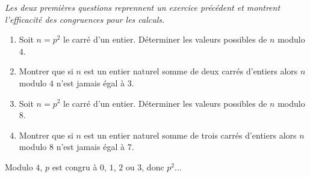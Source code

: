 \documentclass[11pt,class=report,crop=false]{standalone}
\begin{document}
\exercice{}

\enonce
\emph{Les deux premières questions reprennent un exercice précédent et montrent l'efficacité des congruences pour les calculs.}
\begin{enumerate}
    \item Soit $n=p^2$ le carré d'un entier. Déterminer les valeurs possibles de $n$ modulo $4$.
    
    \item Montrer que si $n$ est un entier naturel somme de deux carrés d'entiers 
    alors $n$ modulo $4$ n'est jamais égal à $3$.
    
    \item Soit $n=p^2$ le carré d'un entier. Déterminer les valeurs possibles de $n$ modulo $8$.
        
    \item Montrer que si $n$ est un entier naturel somme de trois carrés d'entiers 
    alors $n$ modulo $8$ n'est jamais égal à $7$.
\end{enumerate} 
\finenonce

\indication
Modulo $4$, $p$ est congru à $0$, $1$, $2$ ou $3$, donc $p^2$...
\finindication
\end{document}

